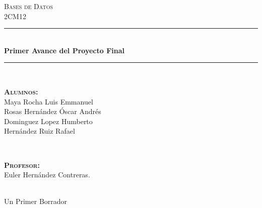 \documentclass[11pt, fleqn]{article}                             %
\author{Oscar Andrés Rosas}                                     %
\begin{document}
\begin{titlepage}

    \center
    \textsc{\Large Bases de Datos}\\[0.5cm] 
    \textsc{\large 2CM12}\\[1.5cm]

    \rule{\linewidth}{0.5mm} \\[1.0cm]
        { \huge \bfseries Primer Avance del Proyecto Final}\\[1.0cm] 
    \rule{\linewidth}{0.5mm} \\[2.0cm]
     
    \begin{minipage}{0.4\textwidth}
        \begin{flushleft} \large
            \textbf{\textsc{Alumnos:}}\\
            \small{
                Maya Rocha Luis Emmanuel        \\
                Rosas Hernández Óscar Andrés    \\
                Dominguez Lopez Humberto        \\
                Hernández Ruiz Rafael
            }
        \end{flushleft}
    \end{minipage}
    ~
    \begin{minipage}{0.4\textwidth}
        \begin{flushright} \large
            \textbf{\textsc{Profesor: }}\\
            Euler Hernández Contreras.
        \end{flushright}
    \end{minipage}\\[3,5cm]

    {\LARGE Un Primer Borrador}\\[4cm] 
    

    \vfill

\end{titlepage}




\end{document}
